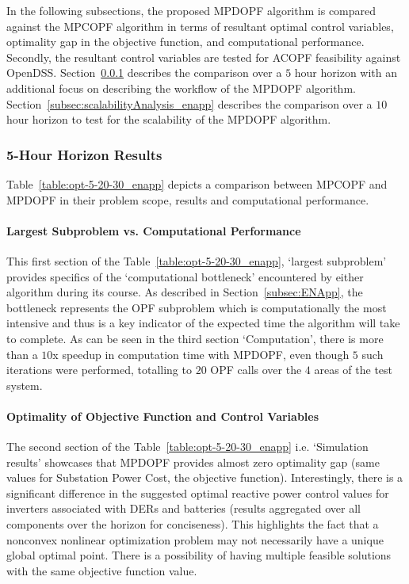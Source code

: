 In the following subsections, the proposed MPDOPF algorithm is compared against the MPCOPF algorithm in terms of resultant optimal control variables, optimality gap in the objective function, and computational performance. Secondly, the resultant control variables are tested for ACOPF feasibility against OpenDSS. Section~\ref{subsec:simulationResults_enapp} describes the comparison over a $5$ hour horizon with an additional focus on describing the workflow of the MPDOPF algorithm. Section~\ref{subsec:scalabilityAnalysis_enapp} describes the comparison over a $10$ hour horizon to test for the scalability of the MPDOPF algorithm.

\subsubsection{5-Hour Horizon Results} \label{subsec:simulationResults_enapp}

Table~\ref{table:opt-5-20-30_enapp} depicts a comparison between MPCOPF and MPDOPF in their problem scope, results and computational performance.

\paragraph{Largest Subproblem vs. Computational Performance}
This first section of the Table~\ref{table:opt-5-20-30_enapp}, `largest subproblem' provides specifics of the `computational bottleneck' encountered by either algorithm during its course. As described in Section~\ref{subsec:ENApp}, the bottleneck represents the OPF subproblem which is computationally the most intensive and thus is a key indicator of the expected time the algorithm will take to complete. As can be seen in the third section `Computation', there is more than a $10$x speedup in computation time with MPDOPF, even though $5$ such iterations were performed, totalling to $20$ OPF calls over the $4$ areas of the test system.      

\paragraph{Optimality of Objective Function and Control Variables}
The second section of the Table~\ref{table:opt-5-20-30_enapp} i.e. `Simulation results' showcases that MPDOPF provides almost zero optimality gap (same values for Substation Power Cost, the objective function). Interestingly, there is a significant difference in the suggested optimal reactive power control values for inverters associated with DERs and batteries (results aggregated over all components over the horizon for conciseness). This highlights the fact that a nonconvex nonlinear optimization problem may not necessarily have a unique global optimal point. There is a possibility of having multiple feasible solutions with the same objective function value. 

